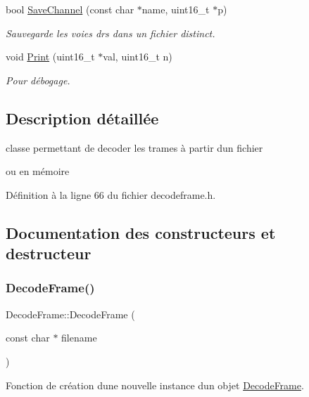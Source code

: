 \begin{DoxyCompactItemize}
bool \hyperlink{class_decode_frame_a8bf6c842a468a6b43ff3c6bc8b184924}{Save\+Channel} (const char $\ast$name, uint16\+\_\+t $\ast$p)
\begin{DoxyCompactList}\small\item\em Sauvegarde les voies drs dans un fichier distinct. \end{DoxyCompactList}\item 
void \hyperlink{class_decode_frame_a83d99fa14a97a0a0d7649afe63a44696}{Print} (uint16\+\_\+t $\ast$val, uint16\+\_\+t n)
\begin{DoxyCompactList}\small\item\em Pour débogage. \end{DoxyCompactList}\end{DoxyCompactItemize}


\subsection{Description détaillée}
classe permettant de decoder les trames à partir d\textquotesingle{}un fichier 

ou en mémoire 

Définition à la ligne 66 du fichier decodeframe.\+h.



\subsection{Documentation des constructeurs et destructeur}
\mbox{\label{class_decode_frame_ad55f7834381bfcdbe5796d11febfe3f0}} 
\subsubsection{\texorpdfstring{Decode\+Frame()}{DecodeFrame()}\hspace{0.1cm}{\footnotesize\ttfamily [1/2]}}
{\footnotesize\ttfamily Decode\+Frame\+::\+Decode\+Frame (\begin{DoxyParamCaption}\item[{const char $\ast$}]{filename }\end{DoxyParamCaption})}



Fonction de création d\textquotesingle{}une nouvelle instance d\textquotesingle{}un objet \hyperlink{class_decode_frame}{Decode\+Frame}. 


